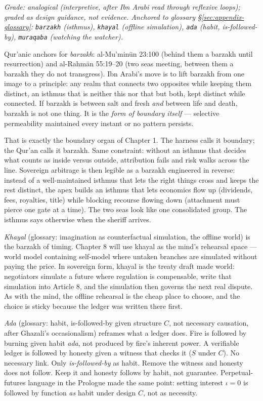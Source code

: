 \textit{Grade: analogical (interpretive, after Ibn Arabi read through reflexive loops); graded as design guidance, not evidence. Anchored to glossary \S\ref{sec:appendix-glossary}: \texttt{barzakh} (isthmus), \texttt{khayal} (offline simulation), \texttt{ada} (habit, is-followed-by), \texttt{muraqaba} (watching the watcher).}

Qur'anic anchors for \textit{barzakh}: al-Mu'min\=un 23:100 (behind them a barzakh until resurrection) and al-Rahm\=an 55:19--20 (two seas meeting, between them a barzakh they do not transgress). Ibn Arabi's move is to lift barzakh from one image to a principle: any realm that connects two opposites while keeping them distinct, an isthmus that is neither this nor that but both, kept distinct while connected. If barzakh is between salt and fresh \textit{and} between life and death, barzakh is not one thing. It is the \textit{form of boundary itself} --- selective permeability maintained every instant or no pattern persists.

That is exactly the boundary organ of Chapter 1. The harness calls it boundary; the Qur'an calls it barzakh. Same constraint: without an isthmus that decides what counts as inside versus outside, attribution fails and risk walks across the line. Sovereign arbitrage is then legible as a barzakh engineered in reverse: instead of a well-maintained isthmus that lets the right things cross and keeps the rest distinct, the apex builds an isthmus that lets economics flow up (dividends, fees, royalties, title) while blocking recourse flowing down (attachment must pierce one gate at a time). The two seas look like one consolidated group. The isthmus says otherwise when the sheriff arrives.

\textit{Khayal} (glossary: imagination as counterfactual simulation, the offline world) is the barzakh of timing. Chapter 8 will use khayal as the mind's rehearsal space --- world model containing self-model where untaken branches are simulated without paying the price. In sovereign form, khayal is the treaty draft made world: negotiators simulate a future where regulation is compensable, write that simulation into Article 8, and the simulation then governs the next real dispute. As with the mind, the offline rehearsal is the cheap place to choose, and the choice is sticky because the ledger was written there first.

\textit{Ada} (glossary: habit, is-followed-by given structure $C$, not necessary causation, after Ghazali's occasionalism) reframes what a ledger does. Fire is followed by burning given habit \textit{ada}, not produced by fire's inherent power. A verifiable ledger is followed by honesty given a witness that checks it ($S$ under $C$). No necessary link. Only \textit{is-followed-by} as habit. Remove the witness and honesty does not follow. Keep it and honesty follows by habit, not guarantee. Perpetual-futures language in the Prologue made the same point: setting interest $\iota=0$ is followed by function \textit{as} habit under design $C$, not as necessity.


